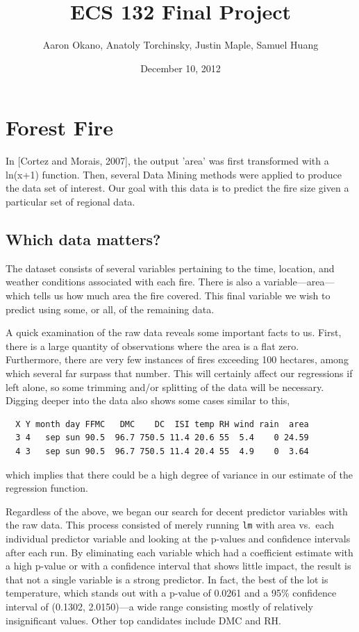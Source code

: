 \documentclass{article}
\title{ECS 132 Final Project}  %
\author{Aaron Okano, Anatoly Torchinsky, Justin Maple, Samuel Huang }    %
\date{December 10, 2012}   %
\begin{document}

\maketitle                 %



\section{Forest Fire}

In [Cortez and Morais, 2007], the output 'area' was first transformed with a ln(x+1) function. 
Then, several Data Mining methods were applied to produce the data set of interest. Our goal with
this data is to predict the fire size given a particular set of regional data.

\subsection{Which data matters?}

The dataset consists of several variables pertaining to the time, location, and
weather conditions associated with each fire. There is also a
variable---area---which tells us how much area the fire covered. This final
variable we wish to predict using some, or all, of the remaining data.

A quick examination of the raw data reveals some important facts to us. First,
there is a large quantity of observations where the area is a flat zero.
Furthermore, there are very few instances of fires exceeding 100 hectares,
among which several far surpass that number. This will certainly affect our
regressions if left alone, so some trimming and/or splitting of the data will
be necessary. Digging deeper into the data also shows some cases similar to
this,
\begin{verbatim}
  X Y month day FFMC   DMC    DC  ISI temp RH wind rain  area
  3 4   sep sun 90.5  96.7 750.5 11.4 20.6 55  5.4    0 24.59
  4 3   sep sun 90.5  96.7 750.5 11.4 20.4 55  4.9    0  3.64
\end{verbatim}
which implies that there could be a high degree of variance in our estimate of
the regression function.

Regardless of the above, we began our search for decent predictor variables
with the raw data. This process consisted of merely running \verb=lm= with area
vs.\ each individual predictor variable and looking at the p-values and
confidence intervals after each run. By eliminating each variable which had a
coefficient estimate with a high p-value or with a confidence interval that
shows little impact, the result is that not a single variable is a strong
predictor. In fact, the best of the lot is temperature, which stands out with a
p-value of 0.0261 and a 95\% confidence interval of (0.1302, 2.0150)---a
wide range consisting mostly of relatively insignificant values. Other top
candidates include DMC and RH.
\end{document}
